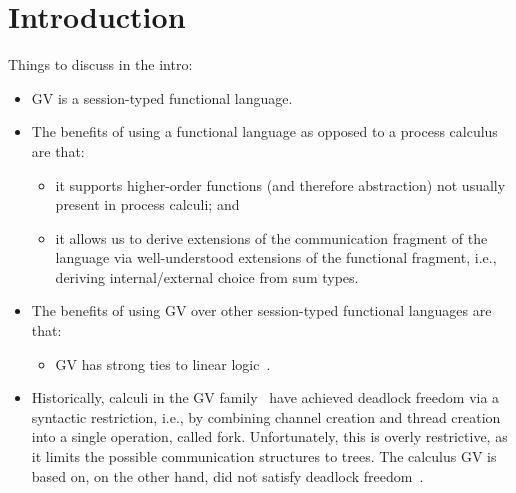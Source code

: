 \documentclass[main.tex]{subfiles}
\begin{document}
\section{Introduction}

Things to discuss in the intro:

\begin{itemize}
\item GV is a session-typed functional language.
\item
  The benefits of using a functional language as opposed to a process calculus are that:
  \begin{itemize}
  \item 
    it supports higher-order functions (and therefore abstraction) not usually present in process calculi; and
  \item
    it allows us to derive extensions of the communication fragment of the language via well-understood extensions of the functional fragment, i.e., deriving internal/external choice from sum types.
  \end{itemize}
\item
  The benefits of using GV over other session-typed functional languages are that:
  \begin{itemize}
  \item
    GV has strong ties to linear logic~\cite{wadler15}.
  \end{itemize}
\item
  Historically, calculi in the GV family~\cite{wadler15,lindley15} have achieved deadlock freedom via a syntactic restriction, i.e., by combining channel creation and thread creation into a single operation, called fork. Unfortunately, this is overly restrictive, as it limits the possible communication structures to trees. The calculus GV is based on, on the other hand, did not satisfy deadlock freedom~\cite{GAY2019}.
\end{itemize}
\end{document}
